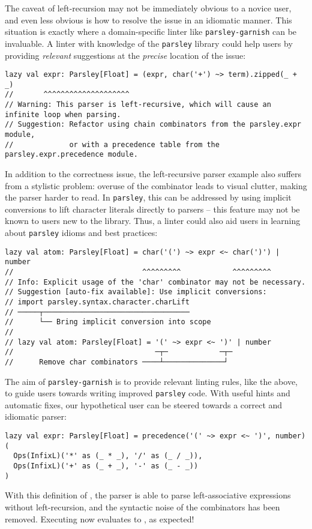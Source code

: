\documentclass[../../main.tex]{subfiles}
\begin{document}
The caveat of left-recursion may not be immediately obvious to a novice user, and even less obvious is how to resolve the issue in an idiomatic manner.
This situation is exactly where a domain-specific linter like \texttt{parsley-garnish} can be invaluable.
A linter with knowledge of the \texttt{parsley} library could help users by providing \emph{relevant} suggestions at the \emph{precise} location of the issue:
\begin{verbatim}
lazy val expr: Parsley[Float] = (expr, char('+') ~> term).zipped(_ + _)
//       ^^^^^^^^^^^^^^^^^^^^
// Warning: This parser is left-recursive, which will cause an infinite loop when parsing.
// Suggestion: Refactor using chain combinators from the parsley.expr module,
//             or with a precedence table from the parsley.expr.precedence module.
\end{verbatim}
%
In addition to the correctness issue, the left-recursive parser example also suffers from a stylistic problem:
overuse of the \scala{char} combinator leads to visual clutter, making the parser harder to read.
In \texttt{parsley}, this can be addressed by using implicit conversions to lift character literals directly to parsers -- this feature may not be known to users new to the library.
Thus, a linter could also aid users in learning about \texttt{parsley} idioms and best practices:
\begin{verbatim}
lazy val atom: Parsley[Float] = char('(') ~> expr <~ char(')') | number
//                              ^^^^^^^^^            ^^^^^^^^^
// Info: Explicit usage of the 'char' combinator may not be necessary.
// Suggestion [auto-fix available]: Use implicit conversions:
// import parsley.syntax.character.charLift
// ─────┬──────────────────────────────────
//      └── Bring implicit conversion into scope
//
// lazy val atom: Parsley[Float] = '(' ~> expr <~ ')' | number
//                                 ─┬─            ─┬─
//      Remove char combinators ────┴──────────────┘
\end{verbatim}
%
The aim of \texttt{parsley-garnish} is to provide relevant linting rules, like the above, to guide users towards writing improved \texttt{parsley} code.
With useful hints and automatic fixes, our hypothetical user can be steered towards a correct and idiomatic parser:
\begin{verbatim}
lazy val expr: Parsley[Float] = precedence('(' ~> expr <~ ')', number)(
  Ops(InfixL)('*' as (_ * _), '/' as (_ / _)),
  Ops(InfixL)('+' as (_ + _), '-' as (_ - _))
)
\end{verbatim}
%
With this definition of , the parser is able to parse left-associative expressions without left-recursion, and the syntactic noise of the  combinators has been removed.
Executing \scala{expr.parse("1+2*3/4")} now evaluates to \scala{2.5}, as expected!
\end{document}
